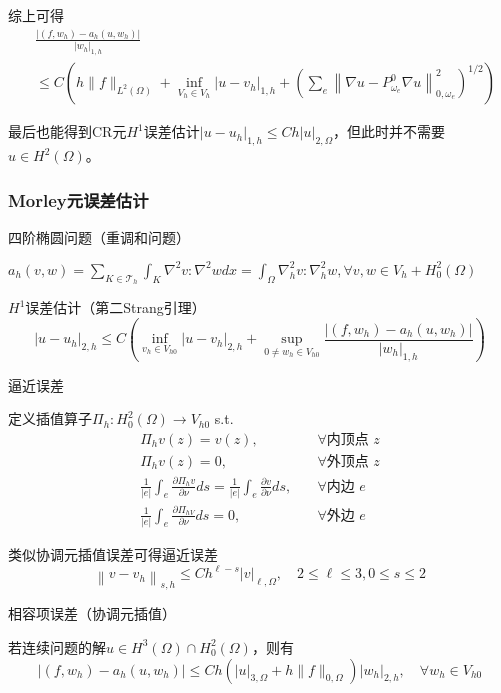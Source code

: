 综上可得
\[
  \begin{aligned}
    &\frac{\left|\left(f, w_{h}\right)-a_{h}\left(u, w_{h}\right)\right|}{\left|w_{h}\right|_{1, h}}\\
    &\le C\left(h\|f\|_{L^{2}(\Omega)}+\inf _{V_{h} \in V_{h}}\left|u-v_{h}\right|_{1, h}+\left(\sum_{e}\left\|\nabla u-P_{\omega_{e}}^{0} \nabla u\right\|_{0, \omega_{e}}^{2}\right)^{1 / 2}\right)
  \end{aligned}
\]

最后也能得到CR元$H^1$误差估计$|u-u_h|_{1, h} \le C h|u|_{2, \Omega}$，但此时并不需要$u \in H^2(\Omega)$。

\subsubsection{Morley元误差估计}

四阶椭圆问题（重调和问题）

$a_{h}(v, w)=\sum_{K \in \mathcal{T}_{h}} \int_{K} \nabla^{2} v: \nabla^{2} w dx=\int_{\Omega} \nabla_{h}^{2} v: \nabla_{h}^{2} w, \forall v, w \in V_{h}+H_{0}^{2}(\Omega)$

$H^1$误差估计（第二Strang引理）
\[
  \left|u-u_{h}\right|_{2, h} \le C\left(\inf _{v_{h} \in V_{h 0}}\left|u-v_{h}\right|_{2, h}+\sup _{0 \neq w_{h} \in V_{h 0}} \frac{\left|\left(f, w_{h}\right)-a_{h}\left(u, w_{h}\right)\right|}{\left|w_{h}\right|_{1, h}}\right)
\]

逼近误差

定义插值算子$\Pi_h: H_0^2(\Omega) \to V_{h0}$ s.t.
\[
  \begin{aligned}
    \Pi_{h} v(z)=v(z),& \quad \forall \text{内顶点 } z \\
    \Pi_{h} v(z)=0,& \quad \forall \text{外顶点 } z \\
    \frac{1}{|e|} \int_{e} \frac{\partial \Pi_{h} v}{\partial \nu} ds =\frac{1}{|e|} \int_{e} \frac{\partial v}{\partial \nu} ds,& \quad \forall \text{内边 } e \\
    \frac{1}{|e|} \int_{e} \frac{\partial \Pi_{h V}}{\partial \nu} ds =0,& \quad \forall \text{外边 } e 
  \end{aligned}
\]

类似协调元插值误差可得逼近误差
\[
  \left\|v-v_{h}\right\|_{s, h} \leq C h^{\ell-s}|v|_{\ell, \Omega}, \quad 2 \leq \ell \leq 3,0 \leq s \leq 2
\]

相容项误差（协调元插值）

若连续问题的解$u \in H^{3}(\Omega) \cap H_{0}^{2}(\Omega)$，则有
\[
  \left|\left(f, w_{h}\right)-a_{h}\left(u, w_{h}\right)\right| \le C h\left(|u|_{3, \Omega}+h\|f\|_{0, \Omega}\right)\left|w_{h}\right|_{2, h}, \quad \forall w_{h} \in V_{h 0}
\]

